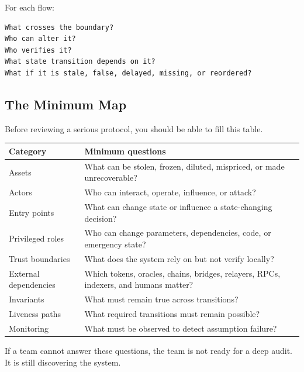 For each flow:

\begin{lstlisting}
What crosses the boundary?
Who can alter it?
Who verifies it?
What state transition depends on it?
What if it is stale, false, delayed, missing, or reordered?
\end{lstlisting}

\subsection{The Minimum Map}

Before reviewing a serious protocol, you should be able to fill this
table.

{\def\LTcaptype{none} %
\begin{longtable}[]{@{}
  >{\raggedright\arraybackslash}p{}
  >{\raggedright\arraybackslash}p{}@{}}
\toprule\noalign{}
\begin{minipage}[b]{\linewidth}\raggedright
Category
\end{minipage} & \begin{minipage}[b]{\linewidth}\raggedright
Minimum questions
\end{minipage} \\
\midrule\noalign{}
\endhead
\bottomrule\noalign{}
\endlastfoot
Assets & What can be stolen, frozen, diluted, mispriced, or made
unrecoverable? \\
Actors & Who can interact, operate, influence, or attack? \\
Entry points & What can change state or influence a state-changing
decision? \\
Privileged roles & Who can change parameters, dependencies, code, or
emergency state? \\
Trust boundaries & What does the system rely on but not verify
locally? \\
External dependencies & Which tokens, oracles, chains, bridges,
relayers, RPCs, indexers, and humans matter? \\
Invariants & What must remain true across transitions? \\
Liveness paths & What required transitions must remain possible? \\
Monitoring & What must be observed to detect assumption failure? \\
\end{longtable}
}

If a team cannot answer these questions, the team is not ready for a
deep audit. It is still discovering the system.

